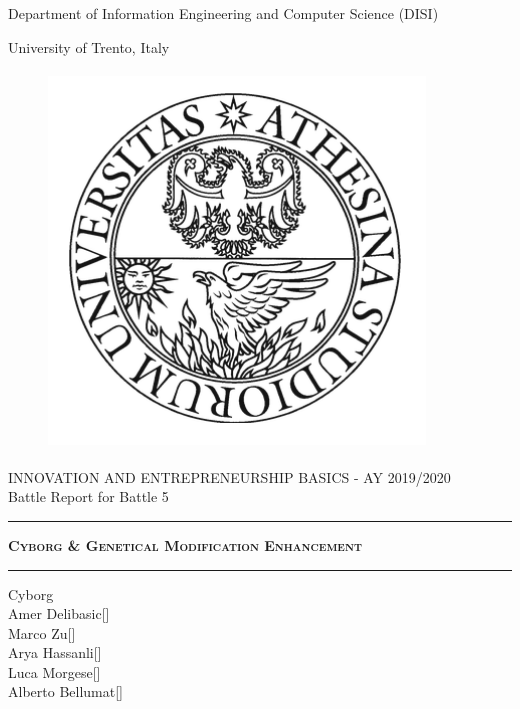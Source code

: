 \pagestyle{plain}

\thispagestyle{empty}

\begin{center}
  \LARGE{Department of Information Engineering and Computer Science (DISI)\\}

  \vspace{1 cm} 
  
  \LARGE{University of Trento, Italy\\}


  \begin{figure}[h]
    \centering
    \includegraphics[height=10cm, width=10cm]{Logo.png}
    \label{fig:dis}
  \end{figure}

  \Large{INNOVATION AND ENTREPRENEURSHIP BASICS - AY 2019/2020\\} 
  \Large{Battle Report for Battle 5}

  \noindent\rule{\textwidth}{1pt}

  \Huge\textsc{\textbf{Cyborg \& Genetical Modification Enhancement\\}}
  \noindent\rule{\textwidth}{1pt}
  
  \begin{multicols}{2}
    \Large{Cyborg\\

    \vspace{1 cm}
    Amer Delibasic[]\\
    Marco Zu[]\\
    Arya Hassanli[]\\
    Luca Morgese[]\\
    Alberto Bellumat[]\\}
  

\end{multicols}
\end{center}
